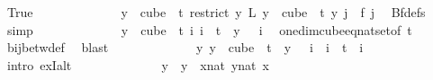 \begin{isabellebody}
\ True\isanewline
\ \ \ \ \ \ \ \ \ \ \isamarkupfalse%
\ \isamarkupfalse%
\ {\isachardoublequoteopen}{\isacharparenleft}{\kern0pt}{\isasymforall}y\ {\isasymin}\ cube\ {}\ t{\isachardot}{\kern0pt}\ {\isacharparenleft}{\kern0pt}restrict\ {\isacharparenleft}{\kern0pt}{\isasymlambda}y{\isachardot}{\kern0pt}\ L\ {\isacharparenleft}{\kern0pt}y\ {}{\isacharparenright}{\kern0pt}{\isacharparenright}{\kern0pt}\ {\isacharparenleft}{\kern0pt}cube\ {}\ t{\isacharparenright}{\kern0pt}{\isacharparenright}{\kern0pt}\ y\ j\ {\isacharequal}{\kern0pt}\ f\ j{\isacharparenright}{\kern0pt}{\isachardoublequoteclose}\ \isamarkupfalse%
\ Bf{\isacharunderscore}{\kern0pt}defs\ \isamarkupfalse%
\ simp\isanewline
\ \ \ \ \ \ \ \ \ \ \isamarkupfalse%
\ \isamarkupfalse%
\ {\isachardoublequoteopen}{\isasymforall}y\ {\isasymin}\ cube\ {}\ t{\isachardot}{\kern0pt}\ {\isacharparenleft}{\kern0pt}{\isasymexists}{\isacharbang}{\kern0pt}i{\isachardot}{\kern0pt}\ i\ {\isacharless}{\kern0pt}\ t\ {\isasymand}\ y\ {}\ {\isacharequal}{\kern0pt}\ i{\isacharparenright}{\kern0pt}{\isachardoublequoteclose}\ \isamarkupfalse%
\ one{\isacharunderscore}{\kern0pt}dim{\isacharunderscore}{\kern0pt}cube{\isacharunderscore}{\kern0pt}eq{\isacharunderscore}{\kern0pt}nat{\isacharunderscore}{\kern0pt}set{\isacharbrackleft}{\kern0pt}of\ {\isachardoublequoteopen}t{\isachardoublequoteclose}{\isacharbrackright}{\kern0pt}\ \isamarkupfalse%
\ bij{\isacharunderscore}{\kern0pt}betw{\isacharunderscore}{\kern0pt}def\ \isamarkupfalse%
\ blast\isanewline
\ \ \ \ \ \ \ \ \ \ \isamarkupfalse%
\ \isamarkupfalse%
\ {\isachardoublequoteopen}{\isasymexists}{\isacharbang}{\kern0pt}y{\isachardot}{\kern0pt}\ y\ {\isasymin}\ cube\ {}\ t\ {\isasymand}\ y\ {}\ {\isacharequal}{\kern0pt}\ i{\isachardoublequoteclose}\ \ {\isachardoublequoteopen}i\ {\isacharless}{\kern0pt}\ t{\isachardoublequoteclose}\ \ i\ \isanewline
\ \ \ \ \ \ \ \ \ \ \isamarkupfalse%
\ {\isacharparenleft}{\kern0pt}intro\ ex{}I{\isacharunderscore}{\kern0pt}alt{\isacharparenright}{\kern0pt}\isanewline
\ \ \ \ \ \ \ \ \ \ \ \ \isamarkupfalse%
\ y\ \ {\isachardoublequoteopen}y\ {\isasymequiv}\ {\isacharparenleft}{\kern0pt}{\isasymlambda}x{\isacharcolon}{\kern0pt}{\isacharcolon}{\kern0pt}nat{\isachardot}{\kern0pt}\ {\isasymlambda}y{\isasymin}{\isacharbraceleft}{\kern0pt}{\isachardot}{\kern0pt}{\isachardot}{\kern0pt}{\isacharless}{\kern0pt}{}{\isacharcolon}{\kern0pt}{\isacharcolon}{\kern0pt}nat{\isacharbraceright}{\kern0pt}{\isachardot}{\kern0pt}\ x{\isacharparenright}{\kern0pt}{\isachardoublequoteclose}\ \isanewline

\end{isabellebody}
